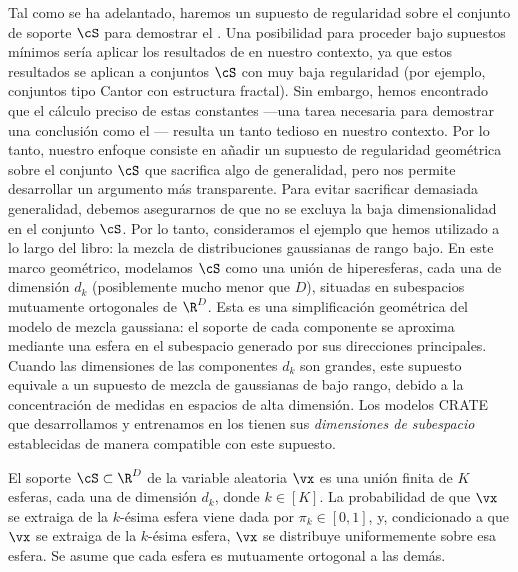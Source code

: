 \documentclass[../../book-main_es.tex]{subfiles}
\begin{document}
Tal como se ha adelantado, haremos un supuesto de regularidad sobre el conjunto de soporte $\cS$
para demostrar el . Una posibilidad para
proceder bajo supuestos mínimos sería aplicar los resultados de
\cite{Riegler2018-jh,Riegler2023-rr} en nuestro contexto, ya que estos resultados se aplican
a conjuntos $\cS$ con muy baja regularidad (por ejemplo, conjuntos tipo Cantor con estructura
fractal). Sin embargo, hemos encontrado que el cálculo preciso de estas constantes 
---una tarea necesaria para demostrar una conclusión como el
--- resulta un tanto tedioso en nuestro
contexto.
Por lo tanto, nuestro enfoque consiste en añadir un supuesto de regularidad geométrica sobre
el conjunto $\cS$ que sacrifica algo de generalidad, pero nos permite desarrollar
un argumento más transparente. Para evitar sacrificar demasiada generalidad, debemos
asegurarnos de que no se excluya la baja dimensionalidad en el conjunto $\cS$.
Por lo tanto, consideramos el ejemplo que hemos utilizado a lo largo del libro: la
mezcla de distribuciones gaussianas de rango bajo. En este marco geométrico,
modelamos $\cS$ como una unión de hiperesferas, cada una de dimensión $d_k$ (posiblemente
mucho menor que $D$), situadas en subespacios mutuamente ortogonales de $\R^D$.
Esta es una simplificación geométrica del modelo de mezcla gaussiana: el soporte de cada
componente se aproxima mediante una esfera en el subespacio generado por sus
direcciones principales. Cuando las dimensiones de las componentes $d_k$ son grandes, este
supuesto equivale a un supuesto de mezcla de gaussianas de bajo rango, debido a
la concentración de medidas en espacios de alta dimensión. Los modelos CRATE que desarrollamos y entrenamos en los
 tienen sus \textit{dimensiones de subespacio}
establecidas de manera compatible con este supuesto.

\begin{assumption}\label{assumption:union-of-spheres}
    El soporte $\cS \subset \R^D$ de la variable aleatoria $\vx$ es una unión finita
    de $K$ esferas, cada una de dimensión $d_k$, donde $k \in [K]$.
    La probabilidad de que $\vx$ se extraiga de la $k$-ésima esfera viene dada por
    $\pi_k \in [0, 1]$, y, condicionado a que $\vx$ se extraiga de la $k$-ésima esfera,
    $\vx$ se distribuye uniformemente sobre esa esfera.
    Se asume que cada esfera es mutuamente ortogonal a 
    las demás.
\end{assumption}
\end{document}
